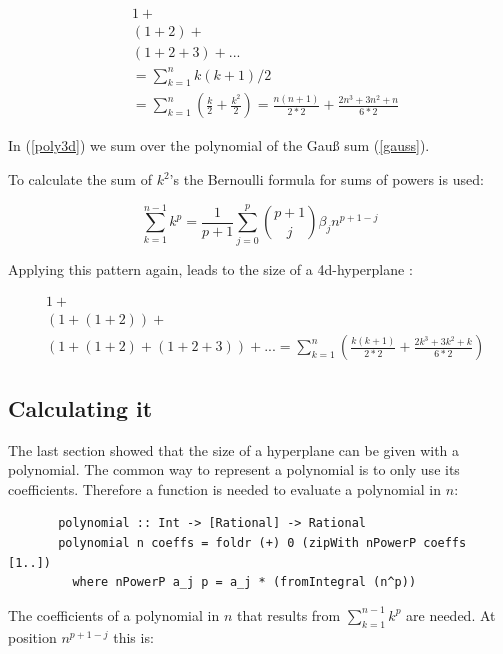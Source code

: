 \documentclass{tmr}
\begin{document}
\begin{equation} \label{poly3d}
\begin{split}
& 1 +\\
&(1+2) +\\
&(1+2+3) + ... \\
& = \sum_{k=1}^{n}  k (k+1)/2 \\
& = \sum_{k=1}^{n} (\frac{k}{2} + \frac{k^2}{2}) = \frac{ n (n+1) }{2*2} + \frac{2n^3+3n^2+n}{6*2} 
\end{split}
\end{equation}

In (\ref{poly3d}) we sum over the polynomial of the Gauß sum (\ref{gauss}).

To calculate the sum of $k^2$'s the Bernoulli formula for sums of powers is used:

\begin{equation} \label{bernoulli}
\boxed{
\sum_{k=1}^{n-1} k^p = \frac{1}{p+1} \sum_{j=0}^{p} \binom{p+1}{j} \beta_{j} n^{p+1-j}
}
\end{equation}



Applying this pattern again, leads to the size of a 4d-hyperplane :

\begin{equation}\label{poly4d}
\begin{split}
 & 1 +\\
 &(1+(1+2) )+ \\
 &(1+(1+2)+(1+2+3)) + ... = \sum_{k=1}^{n} (\frac{ k (k+1) }{2*2}  + \frac{2k^3+3k^2+k}{6*2})
\end{split}
\end{equation}

\subsection { Calculating it }

The last section showed that the size of a hyperplane can be given with a polynomial. The common way to represent a polynomial is to only use its coefficients. Therefore a function is needed to evaluate a polynomial in $n$:
\small
\begin{Verbatim}
       polynomial :: Int -> [Rational] -> Rational
       polynomial n coeffs = foldr (+) 0 (zipWith nPowerP coeffs [1..])
         where nPowerP a_j p = a_j * (fromIntegral (n^p))
\end{Verbatim}

The coefficients of a polynomial in $n$ that results from $\sum_{k=1}^{n-1} k^p$ are needed. At position $n^{p+1-j}$ this is:
\end{document}
